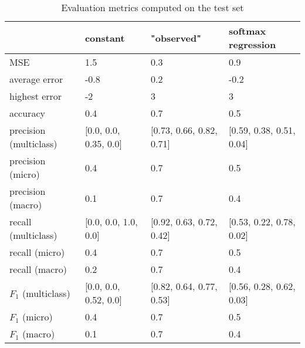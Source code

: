 \begin{table}[H]
\caption{Evaluation metrics computed on the test set}
\label{tbl:sais_eval_test}
\begin{tabular}{llll}
\toprule
 & constant & "observed" & softmax regression \\
\midrule
MSE & 1.5 & 0.3 & 0.9 \\
average error & -0.8 & 0.2 & -0.2 \\
highest error & -2 & 3 & 3 \\
accuracy & 0.4 & 0.7 & 0.5 \\
precision (multiclass) & [0.0, 0.0, 0.35, 0.0] & [0.73, 0.66, 0.82, 0.71] & [0.59, 0.38, 0.51, 0.04] \\
precision (micro) & 0.4 & 0.7 & 0.5 \\
precision (macro) & 0.1 & 0.7 & 0.4 \\
recall (multiclass) & [0.0, 0.0, 1.0, 0.0] & [0.92, 0.63, 0.72, 0.42] & [0.53, 0.22, 0.78, 0.02] \\
recall (micro) & 0.4 & 0.7 & 0.5 \\
recall (macro) & 0.2 & 0.7 & 0.4 \\
$F_1$ (multiclass) & [0.0, 0.0, 0.52, 0.0] & [0.82, 0.64, 0.77, 0.53] & [0.56, 0.28, 0.62, 0.03] \\
$F_1$ (micro) & 0.4 & 0.7 & 0.5 \\
$F_1$ (macro) & 0.1 & 0.7 & 0.4 \\
\bottomrule
\end{tabular}
\end{table}
